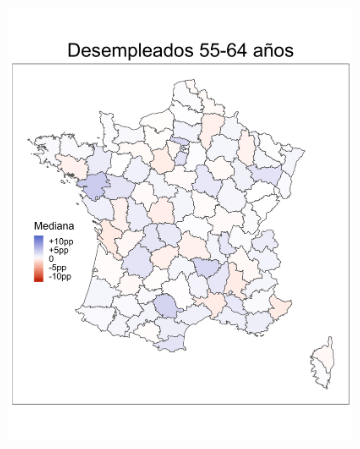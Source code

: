 \begin{figure}
\begin{subfigure}{0.275\textwidth}
	\includegraphics[width = \textwidth]{Figs/Efectos/Mapa_Efectos_Des3_Modelo_H}
	\end{subfigure}
	~
	\begin{subfigure}{0.275\textwidth}

\end{subfigure}
\end{figure}
